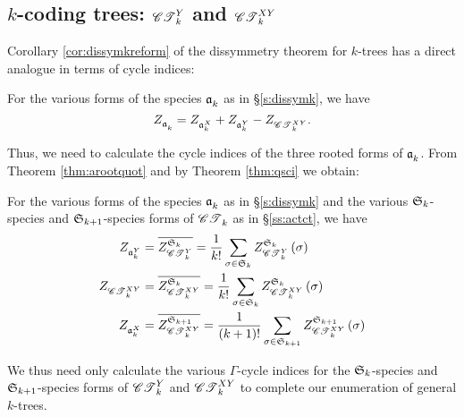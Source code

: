 \documentclass[distribution,draft]{brandiss} %
\numberwithin{section}{chapter}
\numberwithin{figure}{chapter}
\begin{document}
\subsection{$k$-coding trees: $\cty{k}$ and $\ctxy{k}$}\label{ss:ctcycind}
Corollary \ref{cor:dissymkreform} of the dissymmetry theorem for $k$-trees has a direct analogue in terms of cycle indices:
\begin{theorem}
  \label{thm:dissymkci}
  For the various forms of the species $\kt{k}$ as in \S \ref{s:dissymk}, we have
  \begin{equation}
    \label{eq:dissymkci}
    \ci{\kt{k}} = \ci{\ktx{k}} + \ci{\kty{k}} - \ci{\ctxy{k}}.
  \end{equation}
\end{theorem}

Thus, we need to calculate the cycle indices of the three rooted forms of $\kt{k}$.
From Theorem \ref{thm:arootquot} and by Theorem \ref{thm:qsci} we obtain:
\begin{theorem}
  \label{thm:aquotci}
  For the various forms of the species $\kt{k}$ as in \S \ref{s:dissymk} and the various $\symgp{k}$-species and $\symgp{k+1}$-species forms of $\ct{k}$ as in \S \ref{ss:actct}, we have
  \begin{subequations}
    \label{eq:aquotci}
    \begin{align}
      \ci{\kty{k}} &= \qgci{\symgp{k}}{\cty{k}} = \frac{1}{k!} \sum_{\sigma \in \symgp{k}} \gcielt{\symgp{k}}{\cty{k}}{\sigma} \label{eq:ayquotci} \\
      \ci{\ctxy{k}} &= \qgci{\symgp{k}}{\ctxy{k}} = \frac{1}{k!} \sum_{\sigma \in \symgp{k}} \gcielt{\symgp{k}}{\ctxy{k}}{\sigma} \label{eq:axyquotci} \\
      \ci{\ktx{k}} &= \qgci{\symgp{k+1}}{\ctxy{k}} = \frac{1}{\pbrac{k+1}!} \sum_{\sigma \in \symgp{k+1}} \gcielt{\symgp{k+1}}{\ctxy{k}}{\sigma} \label{eq:axquotci}
    \end{align}
  \end{subequations}
\end{theorem}

We thus need only calculate the various $\Gamma$-cycle indices for the $\symgp{k}$-species and $\symgp{k+1}$-species forms of $\cty{k}$ and $\ctxy{k}$ to complete our enumeration of general $k$-trees.
\end{document}
